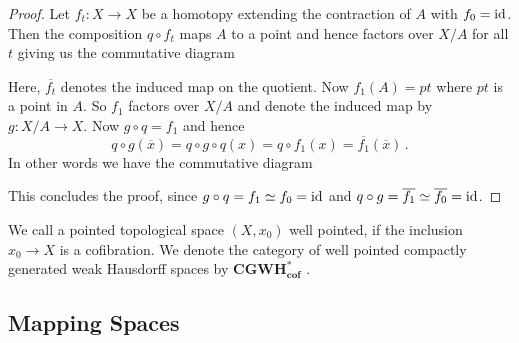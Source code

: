 \begin{proof}
	Let $f_t:X\to X$ be a homotopy extending the contraction of $A$ with $f_0=\operatorname{\mathrm{id}}$. Then the composition $q\circ f_t$ maps $A$ to a point and hence factors over $X\big/A$ for all $t$ giving us the commutative diagram
	\begin{center}
	\end{center} Here, $\overline{f_t}$ denotes the induced map on the quotient. Now $f_1(A)=pt$ where $pt$ is a point in $A$. So $f_1$ factors over $X\big/A$ and denote the induced map by $g:X\big/A \to X$. Now $g\circ q=f_1$ and hence 
	\begin{equation*}
		q\circ g(\overline{x})=q\circ g \circ q (x)=q\circ f_1 (x)=\overline{f_1}(\overline{x})\,.
	\end{equation*} In other words we have the commutative diagram
	\begin{center}
	\end{center} This concludes the proof, since $g\circ q=f_1 \simeq f_0=\operatorname{\mathrm{id}}$ and $q\circ g = \overline{f_1}\simeq \overline{f_0}=\operatorname{\mathrm{id}}$.
\end{proof} 
\begin{definition}
    We call a pointed topological space $(X,x_0)$ well pointed, if the inclusion $x_0\to X$ is a cofibration. We denote the category of well pointed compactly generated weak Hausdorff spaces by 
	$\mathbf{CGWH}^*_{\mathbf{cof}}$ .
\end{definition}
\subsection{Mapping Spaces}

